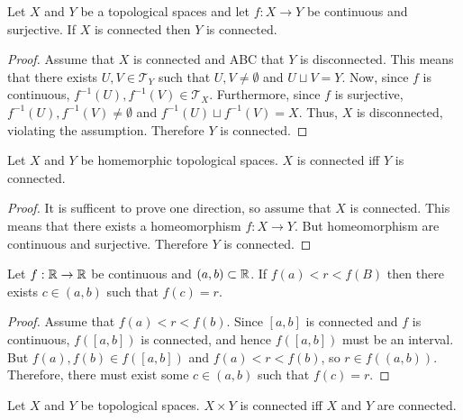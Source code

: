 \documentclass[letterpaper,12pt,fleqn]{article}
\newcommand{\T}{\mathscr{T}}
\begin{document}
\begin{theorem}
  Let \(X\) and \(Y\) be a topological spaces and let \(f:X\to Y\) be continuous and surjective.  If \(X\) is
  connected then \(Y\) is connected.
\end{theorem}

\begin{proof}
  Assume that \(X\) is connected and ABC that \(Y\) is disconnected.  This means that there exists \(U,V\in\T_Y\)
  such that \(U,V\ne\emptyset\) and \(U\sqcup V=Y\).  Now, since \(f\) is continuous, \(f^{-1}(U),f^{-1}(V)\in\T_X\).
  Furthermore, since \(f\) is surjective, \(f^{-1}(U),f^{-1}(V)\ne\emptyset\) and \(f^{-1}(U)\sqcup f^{-1}(V)=X\).
  Thus, \(X\) is disconnected, violating the assumption.  Therefore \(Y\) is connected.
\end{proof}

\begin{corollary}
  Let \(X\) and \(Y\) be homemorphic topological spaces.  \(X\) is connected iff \(Y\) is connected.
\end{corollary}

\begin{proof}
  It is sufficent to prove one direction, so assume that \(X\) is connected.  This means that there exists a
  homeomorphism \(f:X\to Y\).  But homeomorphism are continuous and surjective.  Therefore \(Y\) is connected.
\end{proof}

\begin{theorem}[IVT]
  Let \(f:\mathbb{R}\to\mathbb{R}\) be continuous and \((a,b)\subset\mathbb{R}\).  If \(f(a)<r<f(B)\) then there exists \(c\in(a,b)\)
  such that \(f(c)=r\).
\end{theorem}

\begin{proof}
  Assume that \(f(a)<r<f(b)\).  Since \([a,b]\) is connected and \(f\) is continuous, \(f([a,b])\) is connected,
  and hence \(f([a,b])\) must be an interval.  But \(f(a),f(b)\in f([a,b])\) and \(f(a)<r<f(b)\), so \(r\in
  f((a,b))\).  Therefore, there must exist some \(c\in(a,b)\) such that \(f(c)=r\).
\end{proof}

\begin{theorem}
  Let \(X\) and \(Y\) be topological spaces.  \(X\times Y\) is connected iff \(X\) and \(Y\) are connected.
\end{theorem}
\end{document}
